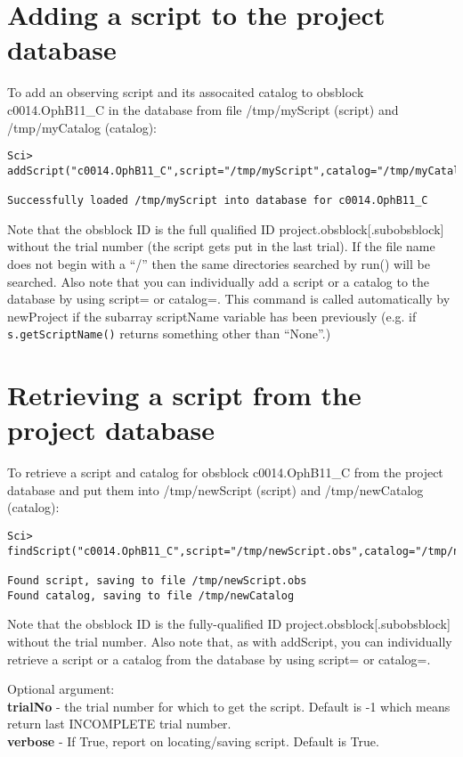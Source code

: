 \documentclass[preprint]{aastex} %
\begin{document}
\section{Adding a script to the project database}
To add an observing script and its assocaited catalog to obsblock
c0014.OphB11\_C in the database from file /tmp/myScript (script) and
/tmp/myCatalog (catalog):
\begin{verbatim}
Sci> addScript("c0014.OphB11_C",script="/tmp/myScript",catalog="/tmp/myCatalog")

Successfully loaded /tmp/myScript into database for c0014.OphB11_C 
\end{verbatim}
\noindent Note that the obsblock ID is the full qualified ID project.obsblock[.subobsblock] without the trial number (the script gets put in the last trial). If the file name does not begin with a ``/'' then the same directories searched by run() will be searched. Also note that you can individually add a script or a catalog to the database by using script= or catalog=.
This command is called automatically by newProject if the subarray scriptName variable has been previously (e.g. if {\tt s.getScriptName()} returns something other than ``None''.)

\section{Retrieving a script from the project database}
To retrieve a script and catalog for obsblock c0014.OphB11\_C from the project database and put them into /tmp/newScript (script) and /tmp/newCatalog (catalog):
\begin{verbatim}
Sci> findScript("c0014.OphB11_C",script="/tmp/newScript.obs",catalog="/tmp/newCatalog")

Found script, saving to file /tmp/newScript.obs
Found catalog, saving to file /tmp/newCatalog
\end{verbatim}
\noindent Note that the obsblock ID is the fully-qualified ID project.obsblock[.subobsblock] without the trial number. Also note that, as with addScript, you can individually retrieve a script or a catalog from the database by using script= or catalog=.

\noindent Optional argument:\\
{\bf trialNo} - the trial number for which to get the script. Default is -1 which means return last INCOMPLETE trial number.\\
{\bf verbose} - If True, report on locating/saving script. Default is True.
\end{document}
